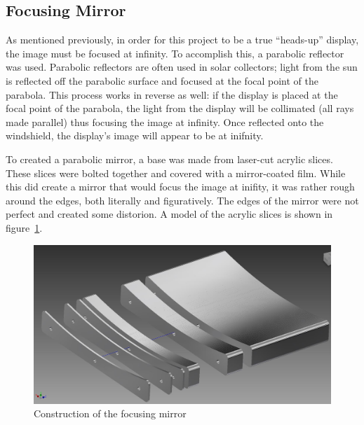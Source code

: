 \subsection{Focusing Mirror}
As mentioned previously, in order for this project to be a true ``heads-up'' 
display, the image must be focused at infinity.  To accomplish this, a 
parabolic reflector was used.  Parabolic reflectors are often used in solar
collectors; light from the sun is reflected off the parabolic surface and
focused at the focal point of the parabola.  This process works in reverse 
as well: if the display is placed at the focal point of the parabola, the
light from the display will be collimated (all rays made parallel) thus
focusing the image at infinity.  Once reflected onto the windshield, the
display's image will appear to be at inifnity.

To created a parabolic mirror, a base was made from laser-cut acrylic slices.
These slices were bolted together and covered with a mirror-coated film.  While
this did create a mirror that would focus the image at inifity, it was rather
rough around the edges, both literally and figuratively.  The edges of the mirror
were not perfect and created some distorion.  A model of the acrylic slices is 
shown in figure~\ref{fig:mirror-render}.

\begin{figure}[h]
\includegraphics[width=\textwidth]{img/mirror_render.jpg}
\caption{Construction of the focusing mirror}
\label{fig:mirror-render}
\end{figure}

